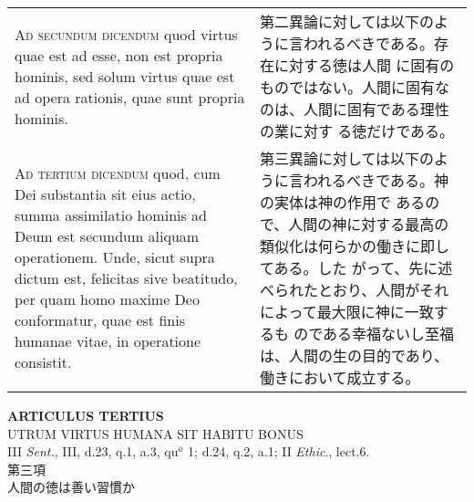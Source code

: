 \documentclass[10pt]{jsarticle}
\begin{document}
\begin{longtable}{p{21em}p{21em}}
\\

{\scshape Ad secundum dicendum} quod virtus quae est ad esse, non est
propria hominis, sed solum virtus quae est ad opera rationis, quae
sunt propria hominis.

&

第二異論に対しては以下のように言われるべきである。存在に対する徳は人間
に固有のものではない。人間に固有なのは、人間に固有である理性の業に対す
る徳だけである。

\\

{\scshape Ad tertium dicendum} quod, cum Dei substantia sit eius
actio, summa assimilatio hominis ad Deum est secundum aliquam
operationem. Unde, sicut supra dictum est, felicitas sive beatitudo,
per quam homo maxime Deo conformatur, quae est finis humanae vitae, in
operatione consistit.

&

第三異論に対しては以下のように言われるべきである。神の実体は神の作用で
あるので、人間の神に対する最高の類似化は何らかの働きに即してある。した
がって、先に述べられたとおり、人間がそれによって最大限に神に一致するも
のである幸福ないし至福は、人間の生の目的であり、働きにおいて成立する。

\end{longtable}
\newpage

\begin{center}
{\Large {\bf ARTICULUS TERTIUS}}\\
{\large UTRUM VIRTUS HUMANA SIT HABITU BONUS}\\
{\footnotesize III {\itshape Sent.}, III, d.23, q.1, a.3, qu$^{a}$ 1; d.24, q.2, a.1; II {\itshape Ethic}., lect.6.}\\
{\Large 第三項\\人間の徳は善い習慣か}
\end{center}
\end{document}
